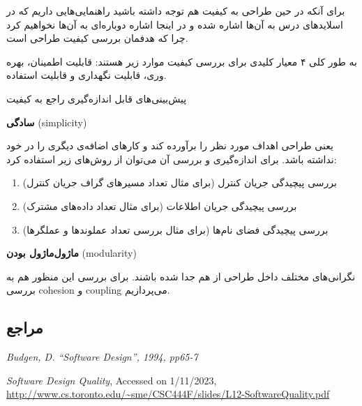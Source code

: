 {برای آنکه در حین طراحی به کیفیت هم توجه داشته باشید راهنمایی‌هایی داریم که در اسلاید‌های درس به آن‌ها اشاره شده و در اینجا اشاره‌ دوباره‌ای به آن‌ها نخواهیم کرد چرا که هدفمان بررسی کیفیت طراحی است.

به طور کلی ۴ معیار کلیدی برای بررسی کیفیت موارد زیر هستند:
قابلیت اطمینان، بهره وری، قابلیت نگهداری و قابلیت استفاده.

{\Large پیش‌بینی‌های قابل اندازه‌گیری راجع به کیفیت}

{\large \textbf{سادگی} (simplicity)}

یعنی طراحی اهداف مورد نظر را برآورده کند و کارهای اضافه‌ی دیگری را در خود نداشته باشد. برای اندازه‌گیری و بررسی آن می‌توان از روش‌های زیر استفاده کرد:
\begin{enumerate}
	\item بررسی پیچیدگی جریان کنترل (برای مثال تعداد مسیرهای گراف جریان کنترل)
	\item بررسی پیچیدگی جریان اطلاعات (برای مثال تعداد داده‌های مشترک)
	\item بررسی پیچیدگی فضای نام‌ها (برای مثال بررسی تعداد عملوند‌ها و عملگرها)
\end{enumerate}


{\large \textbf{ماژول‌ماژول بودن} (modularity)}

نگرانی‌های مختلف داخل طراحی از هم جدا شده باشند. برای بررسی این منظور هم  به بررسی cohesion و coupling می‌پردازیم.


\subsection*{مراجع}

\begin{latin}
	\begingroup
	\renewcommand{\section}[2]{}%
	
\begin{thebibliography}{9}
	\textit{Budgen, D. “Software Design”, 1994, pp65-7}
	
	\textit{Software Design Quality},
	Accessed on 1/11/2023,
	\url{http://www.cs.toronto.edu/~sme/CSC444F/slides/L12-SoftwareQuality.pdf}

\end{thebibliography}
\endgroup
\end{latin}

}
